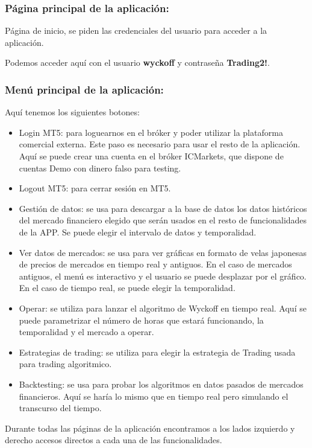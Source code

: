 \subsubsection{Página principal de la aplicación:}

Página de inicio, se piden las credenciales del usuario para acceder a la aplicación.\newline

Podemos acceder aquí con el usuario \textbf{wyckoff} y contraseña \textbf{Trading2!}.\newline

\subsubsection{Menú principal de la aplicación:}

Aquí tenemos los siguientes botones:\newline

\begin{itemize}
	\item Login MT5: para loguearnos en el bróker y poder utilizar la plataforma comercial externa. Este paso es necesario para usar el resto de la aplicación. Aquí se puede crear una cuenta en el bróker ICMarkets, que dispone de cuentas Demo con dinero falso para testing.
	\item Logout MT5: para cerrar sesión en MT5.
	\item Gestión de datos: se usa para descargar a la base de datos los datos históricos del mercado financiero elegido que serán usados en el resto de funcionalidades de la APP. Se puede elegir el intervalo de datos y temporalidad.
	\item Ver datos de mercados: se usa para ver gráficas en formato de velas japonesas de precios de mercados en tiempo real y antiguos. En el caso de mercados antiguos, el menú es interactivo y el usuario se puede desplazar por el gráfico. En el caso de tiempo real, se puede elegir la temporalidad.
	\item Operar: se utiliza para lanzar el algoritmo de Wyckoff en tiempo real. Aquí se puede parametrizar el número de horas que estará funcionando, la temporalidad y el mercado a operar.
	\item Estrategias de trading: se utiliza para elegir la estrategia de Trading usada para trading algoritmico.
	\item Backtesting: se usa para probar los algoritmos en datos pasados de mercados financieros. Aquí se haría lo mismo que en tiempo real pero simulando el transcurso del tiempo.
\end{itemize}

Durante todas las páginas de la aplicación encontramos a los lados izquierdo y derecho accesos directos a cada una de las funcionalidades.\newline
